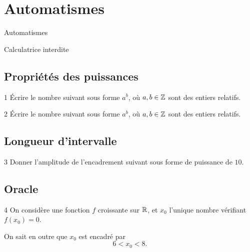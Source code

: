 
\AdvanceDate[3]



\section{Automatismes}

\begin{frame}

\centering \huge
Automatismes

\large
Calculatrice interdite

\end{frame}

\subsection{Propriétés des puissances}

\begin{frame}{1\vspace{-32pt}}
	Écrire le nombre suivant sous forme $a^b$, où $a, b \in \mathbb{Z}$ sont des entiers relatifs.
\end{frame}

\begin{frame}{2\vspace{-32pt}}
	Écrire le nombre suivant sous forme $a^b$, où $a, b \in \mathbb{Z}$ sont des entiers relatifs.
\end{frame}

\subsection{Longueur d'intervalle}

\begin{frame}{3\vspace{-32pt}}
	Donner l'amplitude de l'encadrement suivant sous forme de puissance de $10$.
\end{frame}

\subsection{Oracle}

\begin{frame}{4\vspace{-32pt}}	
	On considère une fonction $f$ croissante sur $\mathbb{R}$, et $x_0$ l'unique nombre vérifiant $f(x_0) = 0$.
	
	On sait en outre que $x_0$ est encadré par
		\[ 6 < x_0 < 8. \]
\end{frame}


